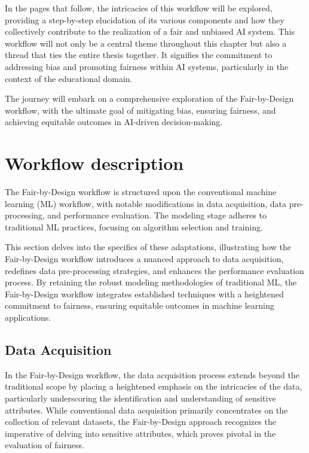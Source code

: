 \documentclass[12pt,a4paper,openright,twoside]{book}
\begin{document}
In the pages that follow, the intricacies of this workflow will be explored, providing a step-by-step elucidation of its various components and how they collectively contribute to the realization of a fair and unbiased AI system. This workflow will not only be a central theme throughout this chapter but also a thread that ties the entire thesis together. It signifies the commitment to addressing bias and promoting fairness within AI systems, particularly in the context of the educational domain. 

The journey will embark on a comprehensive exploration of the Fair-by-Design workflow, with the ultimate goal of mitigating bias, ensuring fairness, and achieving equitable outcomes in AI-driven decision-making.

\section{Workflow description}

The Fair-by-Design workflow is structured upon the conventional machine learning (ML) workflow, with notable modifications in data acquisition, data pre-processing, and performance evaluation. The modeling stage adheres to traditional ML practices, focusing on algorithm selection and training.

This section delves into the specifics of these adaptations, illustrating how the Fair-by-Design workflow introduces a nuanced approach to data acquisition, redefines data pre-processing strategies, and enhances the performance evaluation process. By retaining the robust modeling methodologies of traditional ML, the Fair-by-Design workflow integrates established techniques with a heightened commitment to fairness, ensuring equitable outcomes in machine learning applications.

\subsection{Data Acquisition}

In the Fair-by-Design workflow, the data acquisition process extends beyond the traditional scope by placing a heightened emphasis on the intricacies of the data, particularly underscoring the identification and understanding of sensitive attributes. While conventional data acquisition primarily concentrates on the collection of relevant datasets, the Fair-by-Design approach recognizes the imperative of delving into sensitive attributes, which proves pivotal in the evaluation of fairness.
\end{document}
